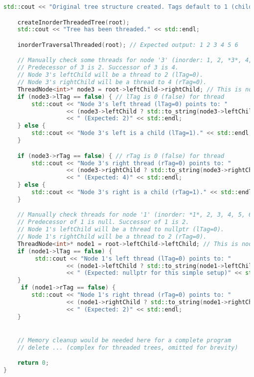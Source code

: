 \begin{lstlisting}[language=C++]
    std::cout << "Original tree structure created. Tags default to 1 (child link potential)." << std::endl;

    createInorderThreadedTree(root);
    std::cout << "Tree has been threaded." << std::endl;

    inorderTraversalThreaded(root); // Expected output: 1 2 3 4 5 6

    // Manually check some threads for node '3' (inorder: 1, 2, *3*, 4, 5, 6)
    // Predecessor of 3 is 2. Successor of 3 is 4.
    // Node 3's leftChild will be a thread to 2 (lTag=0).
    // Node 3's rightChild will be a thread to 4 (rTag=0).
    ThreadNode<int>* node3 = root->leftChild->rightChild; // This is node 3
    if (node3->lTag == false) { // lTag is 0 (false) for thread
        std::cout << "Node 3's left thread (lTag=0) points to: "
                  << (node3->leftChild ? std::to_string(node3->leftChild->data) : "nullptr")
                  << " (Expected: 2)" << std::endl;
    } else {
        std::cout << "Node 3's left is a child (lTag=1)." << std::endl;
    }

    if (node3->rTag == false) { // rTag is 0 (false) for thread
        std::cout << "Node 3's right thread (rTag=0) points to: "
                  << (node3->rightChild ? std::to_string(node3->rightChild->data) : "nullptr")
                  << " (Expected: 4)" << std::endl;
    } else {
        std::cout << "Node 3's right is a child (rTag=1)." << std::endl;
    }

    // Manually check threads for node '1' (inorder: *1*, 2, 3, 4, 5, 6)
    // Predecessor of 1 is null. Successor of 1 is 2.
    // Node 1's leftChild will be a thread to nullptr (lTag=0).
    // Node 1's rightChild will be a thread to 2 (rTag=0).
    ThreadNode<int>* node1 = root->leftChild->leftChild; // This is node 1
    if (node1->lTag == false) {
         std::cout << "Node 1's left thread (lTag=0) points to: "
                  << (node1->leftChild ? std::to_string(node1->leftChild->data) : "nullptr")
                  << " (Expected: nullptr for this simple setup)" << std::endl;
    }
     if (node1->rTag == false) {
        std::cout << "Node 1's right thread (rTag=0) points to: "
                  << (node1->rightChild ? std::to_string(node1->rightChild->data) : "nullptr")
                  << " (Expected: 2)" << std::endl;
    }


    // Memory cleanup would be needed here for a complete program
    // delete ... (complex for threaded trees, omitted for brevity)

    return 0;
}

\end{lstlisting}
